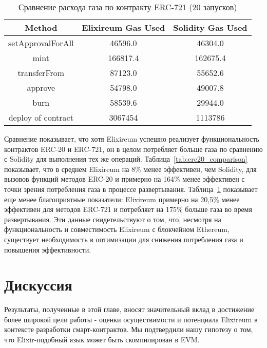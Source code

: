   \begin{table}[h!]
  \centering
  \renewcommand{\arraystretch}{1.2}
  \begin{tabular}{|c|c|c|}
  \hline
  \textbf{Method}         & \textbf{Elixireum Gas Used} & \textbf{Solidity Gas Used} \\ \hline
  setApprovalForAll       & 46596.0              & 46304.0              \\ \hline
  mint                    & 166817.4             & 162675.4             \\ \hline
  transferFrom            & 87123.0              & 55652.6              \\ \hline
  approve                 & 54798.0              & 49007.8              \\ \hline
  burn                    & 58539.6              & 29944.0              \\ \hline
  deploy of contract                 & 3067454              & 1113786              \\ \hline
  \end{tabular}
  \caption{Сравнение расхода газа по контракту ERC-721 (20 запусков)}
  \label{tab:erc721_comparison}
  \end{table}

  Сравнение показывает, что хотя Elixireum успешно реализует функциональность контрактов ERC-20 и ERC-721, он в целом потребляет больше газа по сравнению с Solidity для выполнения тех же операций. Таблица~\ref{tab:erc20_comparison} показывает, что в среднем Elixireum на 8\% менее эффективен, чем Solidity, для вызовов функций методов ERC-20 и примерно на 164\% менее эффективен с точки зрения потребления газа в процессе развертывания. Таблица~\ref{tab:erc721_comparison} показывает еще менее благоприятные показатели: Elixireum примерно на 20,5\% менее эффективен для методов ERC-721 и потребляет на 175\% больше газа во время развертывания. Эти данные свидетельствуют о том, что, несмотря на функциональность и совместимость Elixireum с блокчейном Ethereum, существует необходимость в оптимизации для снижения потребления газа и повышения эффективности.
  
\section{Дискуссия}
\label{sec:discussion}

Результаты, полученные в этой главе, вносят значительный вклад в достижение более широкой цели работы - оценки осуществимости и потенциала Elixireum в контексте разработки смарт-контрактов. Мы подтвердили нашу гипотезу о том, что Elixir-подобный язык может быть скомпилирован в EVM.

